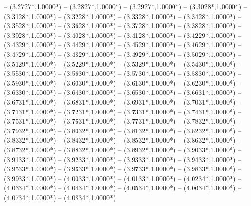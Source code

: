 {	-- ({3.2727*\dx},{1.0000*\dy})
	-- ({3.2827*\dx},{1.0000*\dy})
	-- ({3.2927*\dx},{1.0000*\dy})
	-- ({3.3028*\dx},{1.0000*\dy})
	-- ({3.3128*\dx},{1.0000*\dy})
	-- ({3.3228*\dx},{1.0000*\dy})
	-- ({3.3328*\dx},{1.0000*\dy})
	-- ({3.3428*\dx},{1.0000*\dy})
	-- ({3.3528*\dx},{1.0000*\dy})
	-- ({3.3628*\dx},{1.0000*\dy})
	-- ({3.3728*\dx},{1.0000*\dy})
	-- ({3.3828*\dx},{1.0000*\dy})
	-- ({3.3928*\dx},{1.0000*\dy})
	-- ({3.4028*\dx},{1.0000*\dy})
	-- ({3.4128*\dx},{1.0000*\dy})
	-- ({3.4229*\dx},{1.0000*\dy})
	-- ({3.4329*\dx},{1.0000*\dy})
	-- ({3.4429*\dx},{1.0000*\dy})
	-- ({3.4529*\dx},{1.0000*\dy})
	-- ({3.4629*\dx},{1.0000*\dy})
	-- ({3.4729*\dx},{1.0000*\dy})
	-- ({3.4829*\dx},{1.0000*\dy})
	-- ({3.4929*\dx},{1.0000*\dy})
	-- ({3.5029*\dx},{1.0000*\dy})
	-- ({3.5129*\dx},{1.0000*\dy})
	-- ({3.5229*\dx},{1.0000*\dy})
	-- ({3.5329*\dx},{1.0000*\dy})
	-- ({3.5430*\dx},{1.0000*\dy})
	-- ({3.5530*\dx},{1.0000*\dy})
	-- ({3.5630*\dx},{1.0000*\dy})
	-- ({3.5730*\dx},{1.0000*\dy})
	-- ({3.5830*\dx},{1.0000*\dy})
	-- ({3.5930*\dx},{1.0000*\dy})
	-- ({3.6030*\dx},{1.0000*\dy})
	-- ({3.6130*\dx},{1.0000*\dy})
	-- ({3.6230*\dx},{1.0000*\dy})
	-- ({3.6330*\dx},{1.0000*\dy})
	-- ({3.6430*\dx},{1.0000*\dy})
	-- ({3.6530*\dx},{1.0000*\dy})
	-- ({3.6631*\dx},{1.0000*\dy})
	-- ({3.6731*\dx},{1.0000*\dy})
	-- ({3.6831*\dx},{1.0000*\dy})
	-- ({3.6931*\dx},{1.0000*\dy})
	-- ({3.7031*\dx},{1.0000*\dy})
	-- ({3.7131*\dx},{1.0000*\dy})
	-- ({3.7231*\dx},{1.0000*\dy})
	-- ({3.7331*\dx},{1.0000*\dy})
	-- ({3.7431*\dx},{1.0000*\dy})
	-- ({3.7531*\dx},{1.0000*\dy})
	-- ({3.7631*\dx},{1.0000*\dy})
	-- ({3.7731*\dx},{1.0000*\dy})
	-- ({3.7832*\dx},{1.0000*\dy})
	-- ({3.7932*\dx},{1.0000*\dy})
	-- ({3.8032*\dx},{1.0000*\dy})
	-- ({3.8132*\dx},{1.0000*\dy})
	-- ({3.8232*\dx},{1.0000*\dy})
	-- ({3.8332*\dx},{1.0000*\dy})
	-- ({3.8432*\dx},{1.0000*\dy})
	-- ({3.8532*\dx},{1.0000*\dy})
	-- ({3.8632*\dx},{1.0000*\dy})
	-- ({3.8732*\dx},{1.0000*\dy})
	-- ({3.8832*\dx},{1.0000*\dy})
	-- ({3.8932*\dx},{1.0000*\dy})
	-- ({3.9033*\dx},{1.0000*\dy})
	-- ({3.9133*\dx},{1.0000*\dy})
	-- ({3.9233*\dx},{1.0000*\dy})
	-- ({3.9333*\dx},{1.0000*\dy})
	-- ({3.9433*\dx},{1.0000*\dy})
	-- ({3.9533*\dx},{1.0000*\dy})
	-- ({3.9633*\dx},{1.0000*\dy})
	-- ({3.9733*\dx},{1.0000*\dy})
	-- ({3.9833*\dx},{1.0000*\dy})
	-- ({3.9933*\dx},{1.0000*\dy})
	-- ({4.0033*\dx},{1.0000*\dy})
	-- ({4.0133*\dx},{1.0000*\dy})
	-- ({4.0234*\dx},{1.0000*\dy})
	-- ({4.0334*\dx},{1.0000*\dy})
	-- ({4.0434*\dx},{1.0000*\dy})
	-- ({4.0534*\dx},{1.0000*\dy})
	-- ({4.0634*\dx},{1.0000*\dy})
	-- ({4.0734*\dx},{1.0000*\dy})
	-- ({4.0834*\dx},{1.0000*\dy})
}
